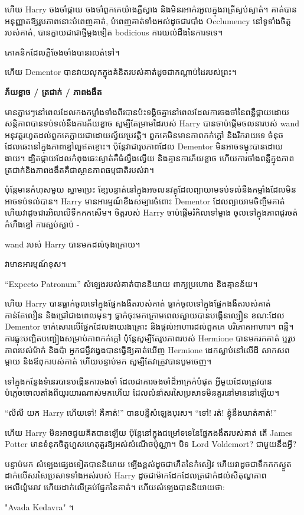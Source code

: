 ហើយ Harry ចងចាំផ្កាយ ចងចាំពួកគេយ៉ាងភ្លឺស្វាង និងមិនរអាក់រអួលក្នុងរាត្រីស្ងប់ស្ងាត់។ គាត់បានអនុញ្ញាតឱ្យរូបភាពនោះបំពេញគាត់, បំពេញគាត់ទាំងអស់ដូចជារបាំង Occlumency នៅទូទាំងចិត្តរបស់គាត់, បានក្លាយជាជាថ្មីម្តងទៀត bodicious ការយល់ដឹងនៃការទទេ។

ភោគនិក​ដែល​ភ្លឺ​ចែងចាំង​បាន​រលត់​ទៅ។

ហើយ Dementor បានវាយលុកក្នុងគំនិតរបស់គាត់ដូចជាកណ្តាប់ដៃរបស់ព្រះ។

\textbf{ភ័យខ្លាច / ត្រជាក់ / ភាពងងឹត}

មានភ្លាមៗនៅពេលដែលកងកម្លាំងទាំងពីរបានប៉ះទង្គិចគ្នានៅពេលដែលការចងចាំនៃពន្លឺផ្កាយដោយសន្តិភាពបានទប់ទល់នឹងការភ័យខ្លាច សូម្បីតែម្រាមដៃរបស់ Harry បានចាប់ផ្តើមចលនារបស់ wand អនុវត្តរហូតដល់ពួកគេក្លាយជាដោយស្វ័យប្រវត្តិ។ ពួកគេមិនមានភាពកក់ក្តៅ និងរីករាយទេ ចំនុចដែលឆេះនៅក្នុងភាពខ្មៅល្អឥតខ្ចោះ។ ប៉ុន្តែវាជារូបភាពដែល Dementor មិនអាចទម្លុះបានដោយងាយ។ ដ្បិត​ផ្កាយ​ដែល​កំពុង​ឆេះ​ស្ងាត់​គឺ​ធំ​ល្វឹងល្វើយ និង​គ្មាន​ការ​ភ័យ​ខ្លាច ហើយ​ការ​ចាំង​ពន្លឺ​ក្នុង​ភាព​ត្រជាក់​និង​ភាព​ងងឹត​គឺជា​ស្ថានភាព​ធម្មជាតិ​របស់​វា។

ប៉ុន្តែមានកំហុសមួយ ស្នាមប្រេះ ខ្សែបន្ទាត់នៅក្នុងអចលនវត្ថុដែលព្យាយាមទប់ទល់នឹងកម្លាំងដែលមិនអាចទប់ទល់បាន។ Harry មានអារម្មណ៍ខឹងសម្បារចំពោះ Dementor ដែលព្យាយាមចិញ្ចឹមគាត់ ហើយវាដូចជារអិលលើទឹកកកសើម។ ចិត្តរបស់ Harry ចាប់ផ្តើមរំកិលទៅម្ខាង ចូលទៅក្នុងភាពជូរចត់ កំហឹងខ្មៅ ការស្អប់ស្លាប់ -

wand របស់ Harry បានមកដល់ចុងក្រោយ។

វាមានអារម្មណ៍ខុស។

“Expecto Patronum” សំឡេងរបស់គាត់បាននិយាយ ពាក្យប្រហោង និងគ្មានន័យ។

ហើយ Harry បានធ្លាក់ចូលទៅក្នុងផ្នែកងងឹតរបស់គាត់ ធ្លាក់ចូលទៅក្នុងផ្នែកងងឹតរបស់គាត់ កាន់តែលឿន និងជ្រៅជាងពេលមុនៗ ធ្លាក់ចុះមកក្រោមពេលស្លាយបានបង្កើនល្បឿន ខណៈដែល Dementor ចាក់សោរលើផ្នែកដែលងាយរងគ្រោះ និងផ្តល់អាហារដល់ពួកគេ បរិភោគអាហារ។ ពន្លឺ។ ការឆ្លុះបញ្ឆិតបញ្ឆៀងសម្រាប់ភាពកក់ក្តៅ ប៉ុន្តែសូម្បីតែរូបភាពរបស់ Hermione បានមករកគាត់ ឬរូបភាពរបស់ម៉ាក់ និងប៉ា អ្នកជម្ងឺវង្វេងបានធ្វើឱ្យគាត់ឃើញ Hermione ដេកស្លាប់នៅលើដី សាកសពម្តាយ និងឪពុករបស់គាត់ ហើយបន្ទាប់មក សូម្បីតែវាត្រូវបានបូមចេញ។

ទៅក្នុងកន្លែងទំនេរបានបង្កើនការចងចាំ ដែលជាការចងចាំដ៏អាក្រក់បំផុត អ្វីមួយដែលត្រូវបានបំភ្លេចចោលតាំងពីយូរយារណាស់មកហើយ ដែលលំនាំសរសៃប្រសាទមិនគួរនៅមាននៅឡើយ។

\begin{em}
“លីលី យក Harry ហើយទៅ! គឺគាត់!” បាន​បន្លឺ​សំឡេង​បុរស។ “ទៅ! រត់! ខ្ញុំនឹងឃាត់គាត់!”

ហើយ Harry មិនអាចជួយគិតបានឡើយ ប៉ុន្តែនៅក្នុងជម្រៅទទេនៃផ្នែកងងឹតរបស់គាត់ តើ James Potter មានទំនុកចិត្តហួសហេតុគួរឱ្យអស់សំណើចប៉ុណ្ណា។ បិទ Lord Voldemort? ជាមួយនឹងអ្វី?

បន្ទាប់មក សំឡេងផ្សេងទៀតបាននិយាយ ឡើងខ្ពស់ដូចជាហឺតនៃកំសៀវ ហើយវាដូចជាទឹកកកស្ងួតដាក់លើសរសៃប្រសាទទាំងអស់របស់ Harry ដូចជាម៉ាកដែកដែលត្រជាក់ដល់សីតុណ្ហភាពអេលីយ៉ូមរាវ ហើយដាក់លើគ្រប់ផ្នែកនៃគាត់។ ហើយសំឡេងបាននិយាយថា:

"Avada Kedavra" ។
\end{em}

